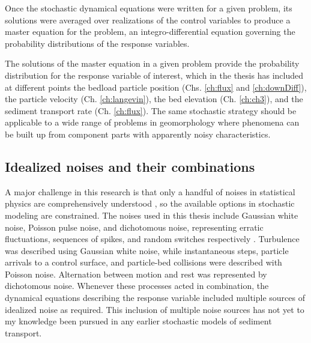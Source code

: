 Once the stochastic dynamical equations were written for a given problem, its solutions were averaged over realizations of the control variables to produce a master equation for the problem, an integro-differential equation governing the probability distributions of the response variables.

The solutions of the master equation in a given problem provide the probability distribution for the response variable of interest, which in the thesis has included at different points the bedload particle position (Chs. \ref{ch:flux} and \ref{ch:downDiff}), the particle velocity (Ch. \ref{ch:langevin}), the bed elevation (Ch. \ref{ch:ch3}), and the sediment transport rate (Ch. \ref{ch:flux}).
The same stochastic strategy should be applicable to a wide range of problems in geomorphology where phenomena can be built up from component parts with apparently noisy characteristics.


\subsection{Idealized noises and their combinations}

A major challenge in this research is that only a handful of noises in statistical physics are comprehensively understood \citep{Horsthemke1984}, so the available options in stochastic modeling are constrained.
The noises used in this thesis include Gaussian white noise, Poisson pulse noise, and dichotomous noise, representing erratic fluctuations, sequences of spikes, and random switches respectively \citep{VanDenBroeck1983}.
Turbulence was described using Gaussian white noise, while instantaneous steps, particle arrivals to a control surface, and particle-bed collisions were described with Poisson noise. Alternation between motion and rest was represented by dichotomous noise.
Whenever these processes acted in combination, the dynamical equations describing the response variable included multiple sources of idealized noise as required.
This inclusion of multiple noise sources has not yet to my knowledge been pursued in any earlier stochastic models of sediment transport.

